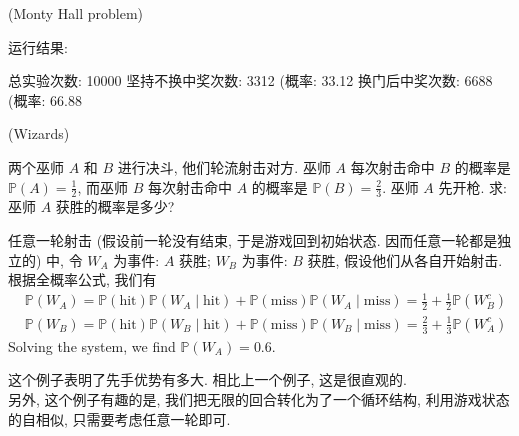 \begin{example}{(Monty Hall problem)}
\begin{remark}
运行结果:

\begin{terminal}[caption={Monty Hall problem simulation result}]
总实验次数: 10000  
坚持不换中奖次数: 3312 (概率: 33.12%
换门后中奖次数: 6688 (概率: 66.88%
\end{terminal}
\end{remark}
\end{example}



\begin{example}{(Wizards)}

两个巫师 \(A\) 和 \(B\) 进行决斗, 他们轮流射击对方. 巫师 \(A\) 每次射击命中 \(B\) 的概率是 \(\mathbb{P}(A)=\frac{1}{2}\), 而巫师 \(B\) 每次射击命中 \(A\) 的概率是 \(\mathbb{P}(B)=\frac{2}{3}\). 巫师 \(A\) 先开枪. 求: 巫师 \(A\) 获胜的概率是多少? \\
\begin{solution}
任意一轮射击 (假设前一轮没有结束, 于是游戏回到初始状态. 因而任意一轮都是独立的) 中,
令 \(W_A\) 为事件: \(A\) 获胜; \(W_B\) 为事件: \(B\) 获胜, 假设他们从各自开始射击. 根据全概率公式, 我们有
$$
\begin{aligned}
& \mathbb{P}\left(W_A\right)=\mathbb{P}(\mathrm{hit}) \mathbb{P}\left(W_A \mid \mathrm{hit}\right)+\mathbb{P}(\mathrm{miss}) \mathbb{P}\left(W_A \mid \mathrm{miss}\right)=\frac{1}{2}+\frac{1}{2} \mathbb{P}\left(W_B^c\right) \\
& \mathbb{P}\left(W_B\right)=\mathbb{P}(\mathrm{hit}) \mathbb{P}\left(W_B \mid \mathrm{hit}\right)+\mathbb{P}(\mathrm{miss}) \mathbb{P}\left(W_B \mid \mathrm{miss}\right)=\frac{2}{3}+\frac{1}{3} \mathbb{P}\left(W_A^c\right)
\end{aligned}
$$
Solving the system, we find $\mathbb{P}\left(W_A\right)=0.6$.
\end{solution}
\begin{remark}
这个例子表明了先手优势有多大. 相比上一个例子, 这是很直观的.\\
另外, 这个例子有趣的是, 我们把无限的回合转化为了一个循环结构, 利用游戏状态的自相似, 只需要考虑任意一轮即可.
\end{remark}    
\end{example}

